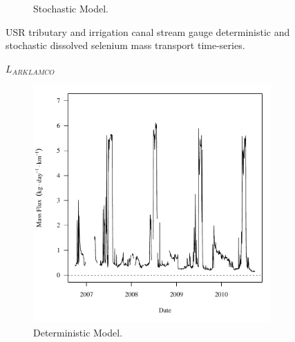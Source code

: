 \begin{landscape}
\begin{figure}
\begin{subfigure}{0.7\textwidth}
			\caption{Stochastic Model.}
		\end{subfigure}
		\caption{USR tributary and irrigation canal stream gauge deterministic and stochastic dissolved selenium mass transport time-series.}
	\end{figure}
\end{landscape}



\subfiguretop
\begin{landscape}
	\begin{figure}
		$ \displaystyle L_{ARKLAMCO} $
		\begin{subfigure}{0.7\textwidth}
			\centering
			\includegraphics[width=\tableCustomSize]{"Figures/Results_DSR/Deterministic/f D101C"}
			\caption{Deterministic Model.}
		\end{subfigure}%
		\begin{subfigure}{0.7\textwidth}
			\centering

\end{subfigure}
\end{figure}
\end{landscape}
